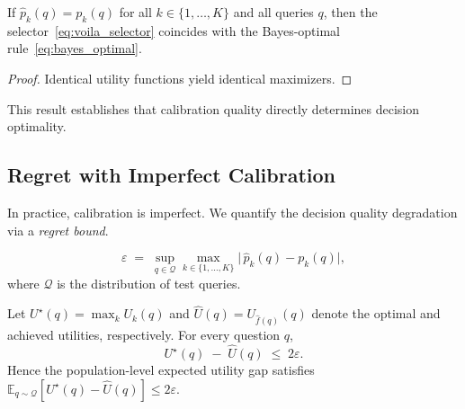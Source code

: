 \begin{proposition}
If $\hat p_k(q)=p_k(q)$ for all $k \in \{1,\dots,K\}$ and all queries $q$,
then the selector~\eqref{eq:voila_selector} coincides with the Bayes-optimal rule~\eqref{eq:bayes_optimal}.
\end{proposition}

\begin{proof}
Identical utility functions yield identical maximizers.
\end{proof}

\noindent
This result establishes that calibration quality directly determines decision optimality.

\vspace{-0.3em}
\subsection{Regret with Imperfect Calibration}
\label{sec:regret}

In practice, calibration is imperfect. We quantify the decision quality degradation
via a \emph{regret bound}.

\begin{definition}

\[
\varepsilon\;=\;
\sup_{q \in \mathcal{Q}}\max_{k \in \{1,\dots,K\}}\bigl|\,\hat p_k(q)-p_k(q)\bigr|,
\]
where $\mathcal{Q}$ is the distribution of test queries.
\end{definition}

\begin{theorem}
\label{thm:regret}
Let $U^\star(q)=\max_{k}U_k(q)$
and $\hat U(q)=U_{\hat f(q)}(q)$ denote the optimal and achieved utilities, respectively.
For every question $q$,
\[
U^\star(q)\;-\;\hat U(q)\;\le\;2\varepsilon.
\]
Hence the population-level expected utility gap satisfies
$\mathbb{E}_{q \sim \mathcal{Q}}[U^\star(q)-\hat U(q)]\le 2\varepsilon.$
\end{theorem}

